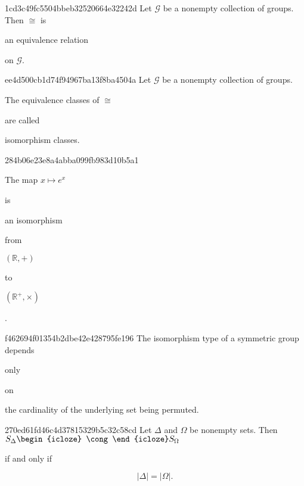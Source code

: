 \begin{note}{1cd3c49fc5504bbeb32520664e32242d}
    Let \({ \mathcal G }\) be a nonempty collection of groups.
    Then \({ \cong }\) is \begin{icloze}{1}an equivalence relation\end{icloze} on \({ \mathcal G }\).
\end{note}

\begin{note}{ee4d500cb1d74f94967ba13f8ba4504a}
    Let \({ \mathcal G }\) be a nonempty collection of groups.
    \begin{icloze}{2}The equivalence classes of \({ \cong }\)\end{icloze} are called \begin{icloze}{1}isomorphism classes.\end{icloze}
\end{note}

\begin{note}{284b06e23e8a4abba099fb983d10b5a1}
    \begin{icloze}{3}The map \({ x \mapsto e^{x} }\)\end{icloze} is \begin{icloze}{2}an isomorphism\end{icloze} from \begin{icloze}{1}\({ (\mathbb R, +) }\)\end{icloze} to \begin{icloze}{1}\({ (\mathbb R^{+}, \times) }\)\end{icloze}.
\end{note}

\begin{note}{f462694f01354b2dbe42e428795fe196}
    The isomorphism type of a symmetric group depends \begin{icloze}{2}only\end{icloze} on \begin{icloze}{1}the cardinality of the underlying set being permuted.\end{icloze}
\end{note}

\begin{note}{270ed61fd46c4d37815329b5c32c58cd}
    Let \({ \Delta }\) and \({ \Omega }\) be nonempty sets. Then \({ S_{\Delta} \begin{icloze}{3}\cong\end{icloze} S_{\Omega} }\) \begin{icloze}{2}if and only if\end{icloze}
    \begin{icloze}{1}
        \[
            \left\lvert \Delta \right\rvert = \left\lvert \Omega \right\rvert.
        \]
    \end{icloze}
\end{note}

